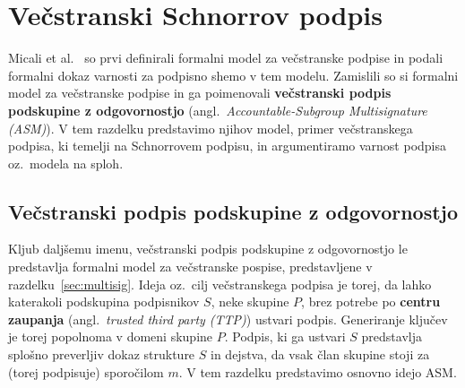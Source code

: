 \section{Večstranski Schnorrov podpis}
\label{sec:multischnorr}
Micali et al.~\cite{micali2001asm} so prvi definirali formalni model za večstranske podpise in podali
formalni dokaz varnosti za podpisno shemo v tem modelu. Zamislili so si formalni model za večstranske
podpise in ga poimenovali \textbf{večstranski podpis podskupine z odgovornostjo} (angl.\
\textit{Accountable-Subgroup Multisignature (ASM)}). V tem razdelku predstavimo njihov model, primer
večstranskega podpisa, ki temelji na Schnorrovem podpisu, in argumentiramo varnost podpisa oz.\
modela na sploh.

\subsection{Večstranski podpis podskupine z odgovornostjo}
Kljub daljšemu imenu, večstranski podpis podskupine z odgovornostjo le predstavlja formalni model za
večstranske pospise, predstavljene v razdelku~\ref{sec:multisig}. Ideja oz.\ cilj večstranskega
podpisa je torej, da lahko katerakoli podskupina podpisnikov $S$, neke skupine $P$, brez potrebe po
\textbf{centru zaupanja} (angl.\ \textit{trusted third party (TTP)}) ustvari podpis. Generiranje
ključev je torej popolnoma v domeni skupine $P$. Podpis, ki ga ustvari $S$ predstavlja splošno
preverljiv dokaz strukture $S$ in dejstva, da vsak član skupine stoji za (torej podpisuje) sporočilom
$m$. V tem razdelku predstavimo osnovno idejo ASM.

